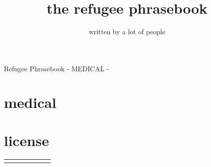 \documentclass[ %
	11pt, %
	paper=a4,
	landscape,
	abstract=on,
	version=last]{scrartcl}
\author{written by a lot of people}
\title{the refugee phrasebook}
\begin{document}
{\Large Refugee Phrasebook - MEDICAL - }
\section*{medical}



\section*{license}
 \newline


\begin{longtabu}{X[l] X[l] X[l] X[l] X[l] X[l]}
\everyrow {\tabucline[ on 1 pt ] - }
\toprule

\midrule
\endhead

\end{longtabu}
\end{document}

